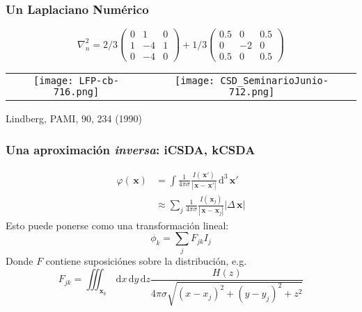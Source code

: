 \documentclass{beamer}
\newcommand{\dd}{\, \mathrm{d}}
\newcommand{\xq}{\, \mathbf{x}}
\begin{document}
\begin{frame}
  \frametitle{Un Laplaciano Numérico}
  \begin{equation}
    \nabla^2_{n}=2/3
    \begin{pmatrix}
      0 & 1 & 0 \\
      1 & -4 & 1 \\
      0 & -4 & 0    
    \end{pmatrix}
    +1/3
    \begin{pmatrix}
      0.5 & 0 & 0.5 \\
      0 & -2 & 0 \\
      0.5 & 0 & 0.5    
    \end{pmatrix}
  \end{equation}
  \begin{center}
  \begin{tabular}{cc}
    \texttt{[image: LFP-cb-716.png]} &
    \texttt{[image: CSD\_SeminarioJunio-712.png]}    
  \end{tabular}
  \end{center}
\begin{flushright}
  {\tiny Lindberg, PAMI, 90, 234 (1990)}   
\end{flushright}
\end{frame}

\begin{frame}
  \frametitle{Una aproximación \emph{inversa}: iCSDA, kCSDA}
    \begin{align}
    \varphi(\xq)
    & =\int \frac{1}{4\pi\sigma}
    \frac{I(\xq')}{|\xq-\xq'|} \dd^3 \xq' \\
    & \approx \sum_j \frac{1}{4\pi\sigma}
    \frac{I(\xq_j)}{|\xq-\xq_j|} |\Delta \xq|     
  \end{align}
    Esto puede ponerse como una transformación lineal:
\begin{equation}
    \phi_k=\sum_j F_{jk} I_j
\end{equation}
Donde $F$ contiene suposiciónes sobre la distribución, e.g.
\begin{equation}
  F_{jk}=\iiint_{\xq_k} \dd x \dd y \dd z
\frac{H(z)}{4\pi\sigma \sqrt{(x-x_j)^2+(y-y_j)^2+z^2}} 
\end{equation}
\end{frame}
\end{document}
